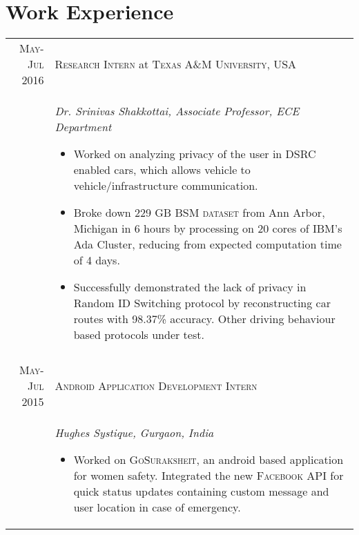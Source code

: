 \documentclass[a4paper,10pt]{article}
\begin{document}
\section{Work Experience}
\centering
\begin{longtable}{r|p{16cm}}
\textsc{May-Jul 2016} & \large \textsc{Research Intern} at \textsc{Texas A\&M University, USA}\\
& \textit{Dr. Srinivas Shakkottai, Associate Professor, ECE Department}
\begin{itemize}
 \item Worked on analyzing privacy of the user in DSRC enabled cars, which allows vehicle to vehicle/infrastructure communication.
 \item Broke down 229 GB \textsc{BSM dataset} from Ann Arbor, Michigan in 6 hours by processing on 20 cores of IBM's Ada Cluster, reducing from expected computation time of 4 days.
 \item Successfully demonstrated the lack of privacy in Random ID Switching protocol by reconstructing car routes with 98.37\% accuracy. Other driving behaviour based protocols under test. \vspace*{-\baselineskip}
\end{itemize}
\\
\multicolumn{2}{c}{}\\
\textsc{May-Jul 2015} & \large \textsc{Android Application Development Intern}\\
& \textit{Hughes Systique, Gurgaon, India}
\begin{itemize}
 \item Worked on \textsc{GoSuraksheit}, an android based application for women safety. Integrated the new \textsc{Facebook API} for quick status updates containing custom message and user location in case of emergency. \vspace*{-\baselineskip}
\end{itemize}\\
\end{longtable}
\end{document}
